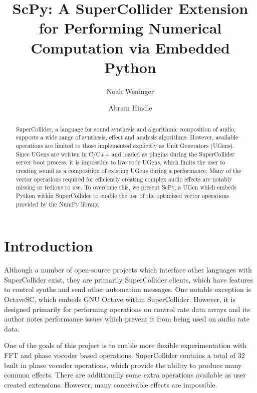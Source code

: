 \documentclass{article}
\begin{document}
\title{ScPy: A SuperCollider Extension for Performing Numerical Computation via Embedded Python}

\author{Noah Weninger \and Abram Hindle}

\maketitle

\begin{abstract}

SuperCollider, a language for sound synthesis and algorithmic composition of audio, supports a wide
range of synthesis, effect and analysis algorithms. However, available operations are limited to
those implemented explicitly as Unit Generators (UGens). Since UGens are written in C/C++ and
loaded as plugins during the SuperCollider server boot process, it is impossible to live code
UGens, which limits the user to creating sound as a composition of existing UGens during a
performance.  Many of the vector operations required for efficiently creating complex audio effects
are notably missing or tedious to use. To overcome this, we present ScPy, a UGen which embeds
Python within SuperCollider to enable the use of the optimized vector operations provided by the
NumPy library.

\end{abstract}

\section{Introduction}

Although a number of open-source projects which interface other languages with SuperCollider exist,
they are primarily SuperCollider clients, which have features to control synths and send other
automation messages.  One notable exception is OctaveSC, which embeds GNU Octave within
SuperCollider.  However, it is designed primarily for performing operations on control rate data
arrays and its author notes performance issues which prevent it from being used on audio rate data.

One of the goals of this project is to enable more flexible experimentation with FFT and phase
vocoder based operations.  SuperCollider contains a total of 32 built in phase vocoder operations,
which provide the ability to produce many common effects. There are additionally some extra
operations available as user created extensions. However, many conceivable effects are impossible.
\end{document}
